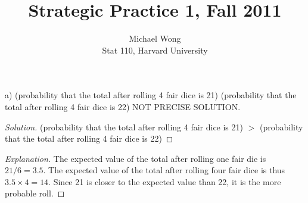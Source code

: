 \documentclass[10pt]{article}
\newenvironment{problem}[2][Problem]{\begin{trivlist}
\item[\hskip \labelsep {\bfseries #1}\hskip \labelsep {\bfseries #2.}]}{\end{trivlist}}
\begin{document}
 
\title{Strategic Practice 1, Fall 2011}
\author{Michael Wong\\
Stat 110, Harvard University}
\maketitle
 
\begin{problem}{1}
(a) (probability that the total after rolling 4 fair dice is 21) \underline{\hspace{1cm}}
(probability that the total after rolling 4 fair dice is 22) NOT PRECISE SOLUTION. 
\end{problem}

\begin{proof}[Solution]

(probability that the total after rolling 4 fair dice is 21) $>$
(probability that the total after rolling 4 fair dice is 22)
\end{proof}

\begin{proof}[Explanation]

The expected value of the total after rolling one fair die is $21 / 6 = 3.5$. The expected value of the total after rolling four fair dice is thus $3.5 \times 4 = 14$. Since 21 is closer to the expected value than 22, it is the more probable roll.
\end{proof}
\end{document}
